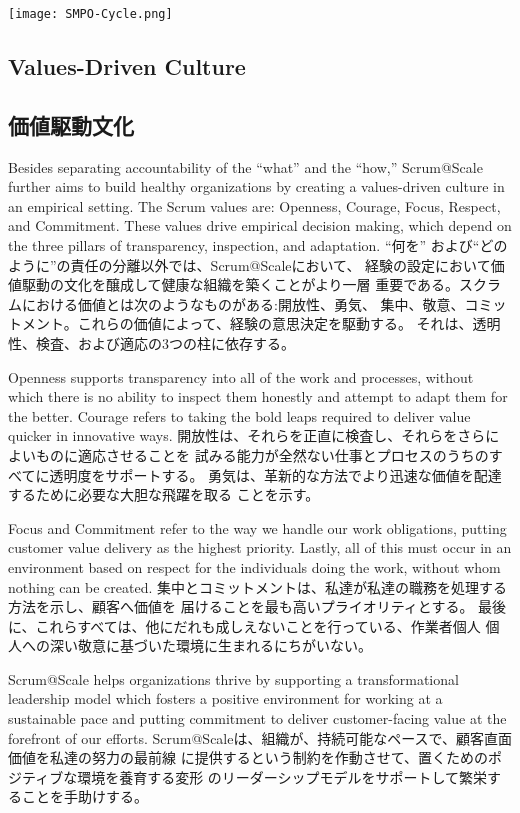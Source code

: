 \documentclass[12pt,a4paper,parskip=full]{scrartcl}
\begin{document}
\texttt{[image: SMPO-Cycle.png]}

\subsection{Values-Driven Culture}
\fi
\subsection{価値駆動文化}
Besides separating accountability of the ``what'' and the ``how,''
Scrum@Scale further aims to build healthy organizations by creating a
values-driven culture in an empirical setting. The Scrum values are:
Openness, Courage, Focus, Respect, and Commitment. These values drive
empirical decision making, which depend on the three pillars of
transparency, inspection, and adaptation.
\fi
``何を'' および``どのように''の責任の分離以外では、Scrum@Scaleにおいて、
経験の設定において価値駆動の文化を醸成して健康な組織を築くことがより一層
重要である。スクラムにおける価値とは次のようなものがある:開放性、勇気、
集中、敬意、コミットメント。これらの価値によって、経験の意思決定を駆動する。
それは、透明性、検査、および適応の3つの柱に依存する。

Openness supports transparency into all of the work and processes, without
which there is no ability to inspect them honestly and attempt to adapt
them for the better. Courage refers to taking the bold leaps required to
deliver value quicker in innovative ways.
\fi
開放性は、それらを正直に検査し、それらをさらによいものに適応させることを
試みる能力が全然ない仕事とプロセスのうちのすべてに透明度をサポートする。
勇気は、革新的な方法でより迅速な価値を配達するために必要な大胆な飛躍を取る
ことを示す。

Focus and Commitment refer to the way we handle our work obligations,
putting customer value delivery as the highest priority. Lastly, all of
this must occur in an environment based on respect for the individuals
doing the work, without whom nothing can be created.
\fi
集中とコミットメントは、私達が私達の職務を処理する方法を示し、顧客へ価値を
届けることを最も高いプライオリティとする。
最後に、これらすべては、他にだれも成しえないことを行っている、作業者個人
個人への深い敬意に基づいた環境に生まれるにちがいない。

Scrum@Scale helps organizations thrive by supporting a
transformational leadership model which fosters a positive environment for
working at a sustainable pace and putting commitment to deliver
customer-facing value at the forefront of our efforts.
\fi
Scrum@Scaleは、組織が、持続可能なペースで、顧客直面価値を私達の努力の最前線
に提供するという制約を作動させて、置くためのポジティブな環境を養育する変形
のリーダーシップモデルをサポートして繁栄することを手助けする。
\end{document}
